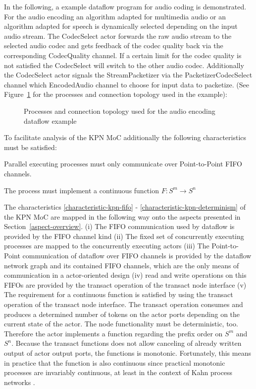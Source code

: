 In the following, a example dataflow program for audio coding
is demonstrated. For the audio encoding an algorithm
adapted for multimedia audio or an algorithm adapted for speech
is dynamically selected depending on the input audio stream.
The CodecSelect actor forwards the raw audio stream to the
selected audio codec and gets feedback of the codec quality back
via the corresponding CodecQuality channel. If a certain
limit for the codec quality is not satisfied the CodecSelect will
switch to the other audio codec. Additionally the CodecSelect actor
signals the StreamPacketizer via the PacketizerCodecSelect channel
which EncodedAudio channel to choose for input data to packetize.
(See Figure~\ref{fig:media-speech-audio-coding}
for the processes and connection topology used in the example):

\begin{figure}[h]
\centering

\caption{Processes and connection topology used for the audio encoding dataflow example}
\label{fig:media-speech-audio-coding}
\end{figure}

To facilitate analysis of the KPN MoC additionally the following
characteristics must be satisfied:
\begin{characteristic}\label{characteristic-kpn-communication}
  Parallel executing processes must only communicate over Point-to-Point FIFO channels.
\end{characteristic}

\begin{characteristic}\label{characteristic-kpn-determinism}
  The process must implement a continuous function $F: S^m \to S^n$
\end{characteristic}

The characteristics \ref{characteristic-kpn-fifo} -
\ref{characteristic-kpn-determinism} of the KPN MoC are mapped in the following way
onto the aspects presented in Section~\ref{aspect-overview}.
(i) The FIFO communication
used by dataflow is provided by the FIFO channel kind
(ii) The fixed set of concurrently executing processes
are mapped to the concurrently executing actors
(iii) The Point-to-Point communication of dataflow over FIFO channels
is provided by the dataflow network graph
and its contained FIFO channels, which are the only means of communication in a
actor-oriented design
(iv) read and write operations on this FIFOs are provided by
the transact operation of the transact node interface
(v) The requirement for a continuous function is satisfied by using the
transact operation of the transact node interface.
The transact operation consumes and produces
a determined number of tokens on the actor ports
depending on the current state of the actor.
The node functionality must be deterministic, too.
Therefore the actor implements a function regarding the
prefix order on $S^m$ and $S^n$. Because the
transact functions does not allow canceling of already
written output of actor output ports, the functions is
monotonic. Fortunately, this means in practice
that the function is also continuous since practical monotonic
processes are invariably continuous, at least in the context
of Kahn process networks \cite{LeeDenotialDF:1997}.

